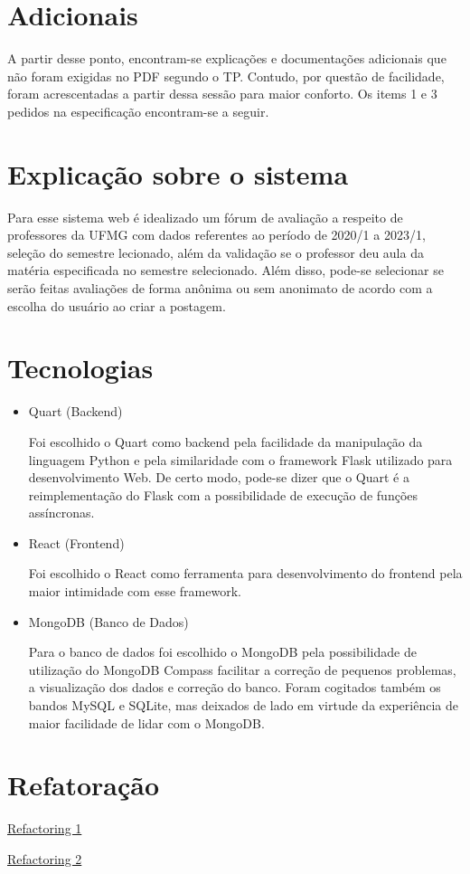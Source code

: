 \documentclass[12pt]{article}
\begin{document}
	\section {Adicionais}
	\par A partir desse ponto, encontram-se explicações e documentações adicionais que não foram exigidas no PDF segundo o TP. Contudo, por questão de facilidade, foram acrescentadas a partir dessa sessão para maior conforto. Os items 1 e 3 pedidos na especificação encontram-se a seguir.
	
	\newpage
	
	\section {Explicação sobre o sistema}
	Para esse sistema web é idealizado um fórum de avaliação a respeito de professores da UFMG com dados referentes ao período de 2020/1 a 2023/1, seleção do semestre lecionado, além da validação se o professor deu aula da matéria especificada no semestre selecionado. Além disso, pode-se selecionar se serão feitas avaliações de forma anônima ou sem anonimato de acordo com a escolha do usuário ao criar a postagem.
	
	\section {Tecnologias}
	\begin {itemize}
	\item Quart (Backend)
	\par Foi escolhido o Quart como backend pela facilidade da manipulação da linguagem Python e pela similaridade com o framework Flask utilizado para desenvolvimento Web. De certo modo, pode-se dizer que o Quart é a reimplementação do Flask com a possibilidade de execução de funções assíncronas.
	\item React (Frontend)
	\par Foi escolhido o React como ferramenta para desenvolvimento do frontend pela maior intimidade com esse framework.
	\item MongoDB (Banco de Dados)
	\par Para o banco de dados foi escolhido o MongoDB pela possibilidade de utilização do MongoDB Compass facilitar a correção de pequenos problemas, a visualização dos dados e correção do banco. Foram cogitados também os bandos MySQL e SQLite, mas deixados de lado em virtude da experiência de maior facilidade de lidar com o MongoDB. 
	\end {itemize}
	
	\section{Refatoração}
	
	\par \href{https://github.com/matheusflavio/ES2-TP-uni-opinions/commit/513604ddffb299875afa250f774080f2add1972a}{Refactoring 1}
	\par \href{https://github.com/matheusflavio/ES2-TP-uni-opinions/commit/513604ddffb299875afa250f774080f2add1972a}{Refactoring 2}
\end{document}
